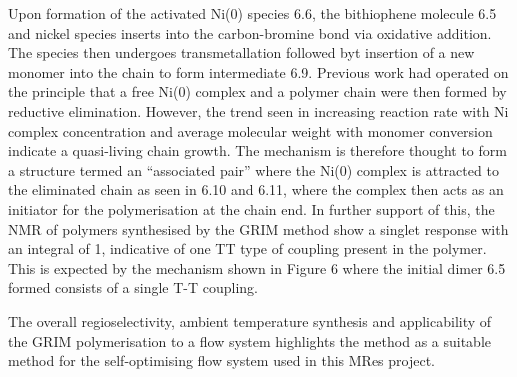 Upon formation of the activated Ni(0) species 6.6, the bithiophene molecule 6.5 and nickel species inserts into the carbon-bromine bond via oxidative addition. The species then undergoes transmetallation followed byt insertion of a new monomer into the chain to form intermediate 6.9. Previous work had operated on the principle that a free Ni(0) complex and a polymer chain were then formed by reductive elimination. However, the trend seen in increasing reaction rate with Ni complex concentration and average molecular weight with monomer conversion indicate a quasi-living chain growth. The mechanism is therefore thought to form a structure termed an “associated pair” where the Ni(0) complex is attracted to the eliminated chain as seen in 6.10 and 6.11, where the complex then acts as an initiator for the polymerisation at the chain end. In further support of this, the NMR of polymers synthesised by the GRIM method show a singlet response with an integral of 1, indicative of one TT type of coupling present in the polymer. This is expected by the mechanism shown in Figure 6 where the initial dimer 6.5 formed consists of a single T-T coupling. 

The overall regioselectivity, ambient temperature synthesis and applicability of the GRIM polymerisation to a flow system highlights the method as a suitable method for the self-optimising flow system used in this MRes project. 
